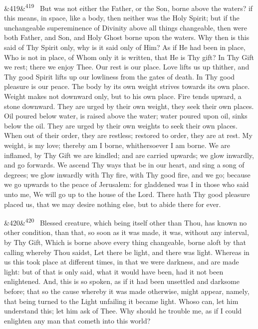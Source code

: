 \documentclass[12pt]{article}
\newcommand{\para}[1][]{\par\noindent\ifx&#1&\else\textsuperscript{\footnotesize #1}~\fi}
\begin{document}
\para[419] But was not either the Father, or the Son, borne above the waters? if this means, in space, like a body, then neither was the Holy Spirit; but if the unchangeable supereminence of Divinity above all things changeable, then were both Father, and Son, and Holy Ghost borne upon the waters. Why then is this said of Thy Spirit only, why is it said only of Him? As if He had been in place, Who is not in place, of Whom only it is written, that He is Thy gift? In Thy Gift we rest; there we enjoy Thee. Our rest is our place. Love lifts us up thither, and Thy good Spirit lifts up our lowliness from the gates of death. In Thy good pleasure is our peace. The body by its own weight strives towards its own place. Weight makes not downward only, but to his own place. Fire tends upward, a stone downward. They are urged by their own weight, they seek their own places. Oil poured below water, is raised above the water; water poured upon oil, sinks below the oil. They are urged by their own weights to seek their own places. When out of their order, they are restless; restored to order, they are at rest. My weight, is my love; thereby am I borne, whithersoever I am borne. We are inflamed, by Thy Gift we are kindled; and are carried upwards; we glow inwardly, and go forwards. We ascend Thy ways that be in our heart, and sing a song of degrees; we glow inwardly with Thy fire, with Thy good fire, and we go; because we go upwards to the peace of Jerusalem: for gladdened was I in those who said unto me, We will go up to the house of the Lord. There hath Thy good pleasure placed us, that we may desire nothing else, but to abide there for ever.

\para[420] Blessed creature, which being itself other than Thou, has known no other condition, than that, so soon as it was made, it was, without any interval, by Thy Gift, Which is borne above every thing changeable, borne aloft by that calling whereby Thou saidst, Let there be light, and there was light. Whereas in us this took place at different times, in that we were darkness, and are made light: but of that is only said, what it would have been, had it not been enlightened. And, this is so spoken, as if it had been unsettled and darksome before; that so the cause whereby it was made otherwise, might appear, namely, that being turned to the Light unfailing it became light. Whoso can, let him understand this; let him ask of Thee. Why should he trouble me, as if I could enlighten any man that cometh into this world?
\end{document}
